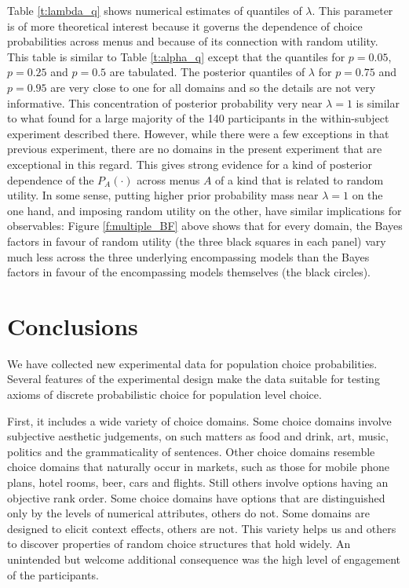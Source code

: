 \documentclass[11pt,letter]{article}
\newcommand{\menus}{menus}
\begin{document}
Table \ref{t:lambda_q} shows numerical estimates of quantiles of $\lambda$.
This parameter is of more theoretical interest because it governs the dependence of choice probabilities across \menus{} and because of its connection with random utility.
This table is similar to Table \ref{t:alpha_q} except that the quantiles for $p=0.05$, $p=0.25$ and $p=0.5$ are tabulated.
The posterior quantiles of $\lambda$ for $p=0.75$ and $p=0.95$ are very close to one for all domains and so the details are not very informative.
This concentration of posterior probability very near $\lambda = 1$ is similar to what  found for a large majority of the 140 participants in the within-subject experiment described there.
However, while there were a few exceptions in that previous experiment, there are no domains in the present experiment that are exceptional in this regard.
This gives strong evidence for a kind of posterior dependence of the $P_A(\cdot)$ across \menus{} $A$ of a kind that is related to random utility.
In some sense, putting higher prior probability mass near $\lambda = 1$ on the one hand, and imposing random utility on the other, have similar implications for observables: Figure \ref{f:multiple_BF} above shows that for every domain, the Bayes factors in favour of random utility (the three black squares in each panel) vary much less across the three underlying encompassing models than the Bayes factors in favour of the encompassing models themselves (the black circles).

\section{Conclusions}\label{s:conclude}

We have collected new experimental data for population choice probabilities.
Several features of the experimental design make the data suitable for testing axioms of discrete probabilistic choice for population level choice.

First, it includes a wide variety of choice domains.
Some choice domains involve subjective aesthetic judgements, on such matters as food and drink, art, music, politics and the grammaticality of sentences.
Other choice domains resemble choice domains that naturally occur in markets, such as those for mobile phone plans, hotel rooms, beer, cars and flights.
Still others involve options having an objective rank order.
Some choice domains have options that are distinguished only by the levels of numerical attributes, others do not.
Some domains are designed to elicit context effects, others are not.
This variety helps us and others to discover properties of random choice structures that hold widely.
An unintended but welcome additional consequence was the high level of engagement of the participants.
\end{document}
